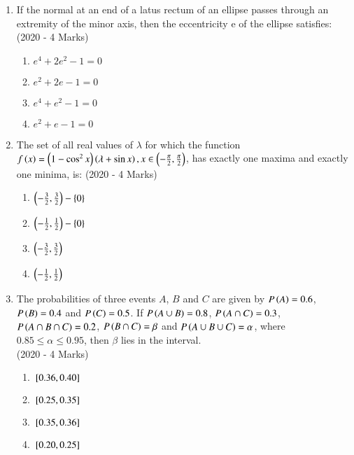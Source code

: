 \documentclass[journal]{IEEEtran}
\begin{document}
    \begin{enumerate}
    \item{
          	If the normal at an end of a latus rectum of an ellipse passes through an extremity of the minor axis, then the eccentricity e of the ellipse satisfies: \\ \text{  }\hfill
                {(2020 - 4 Marks)}
            \begin{multicols}{2}
				\begin{enumerate}
					\item $e^4+2e^2 - 1 = 0$
					\item $e^2+2e - 1 = 0$
					\item $e^4+e^2 - 1 = 0$
					\item $e^2+e - 1 = 0$
				\end{enumerate}
			\end{multicols}
            }
    \item{
            The set of all real values of $\lambda$ for which the function $f\left(x\right) = \left(1- \cos^2 x\right)\left(\lambda+\sin x\right) , x\in\left(-\frac{\pi}{2}, \frac{\pi}{2}\right)$, has exactly one maxima and exactly one minima, is:\hfill
                {(2020 - 4 Marks)}
            \begin{multicols}{2}
                \begin{enumerate}
                    \item $\left(-\frac{3}{2}, \frac{3}{2}\right)-\left\{0\right\}$
                    \item $\left(-\frac{1}{2}, \frac{1}{2}\right)-\left\{0\right\}$
                    \item $\left(-\frac{3}{2}, \frac{3}{2}\right)$
                    \item $\left(-\frac{1}{2}, \frac{1}{2}\right)$
                \end{enumerate}
            \end{multicols}
        }
\item{
        	
        	The probabilities of three events $A$, $B$ and $C$ are given by $P\left(A\right) = 0.6$, $P\left(B\right) = 0.4$ and $P\left(C\right) = 0.5$. If $P\left(A \cup B\right) = 0.8$, $P\left(A \cap C\right) = 0.3$, $P\left(A \cap B \cap C\right) = 0.2$, $P\left(B \cap C\right) = \beta$ and $P\left(A \cup B \cup C\right) = \alpha$, where $0.85 \leq \alpha \leq 0.95$, then $\beta$ lies in the interval. \\
        	\hfill
        	{(2020 - 4 Marks)}
        	\begin{multicols}{4}
        		\begin{enumerate}
        			\item ${}\left[0.36,0.40\right]$
        			\item ${}\left[0.25,0.35\right]$
        			\item ${}\left[0.35,0.36\right]$
        			\item ${}\left[0.20,0.25\right]$
        		\end{enumerate}
        	\end{multicols}
        	
}
\end{enumerate}
\end{document}
